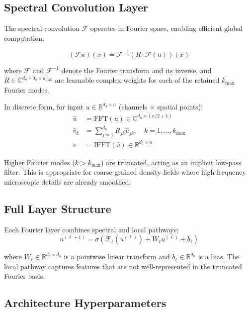 \documentclass[11pt]{article}
\newcommand{\R}{\mathbb{R}}
\begin{document}
\subsection{Spectral Convolution Layer}

The spectral convolution $\mathcal{F}$ operates in Fourier space, enabling efficient global computation:

\begin{equation}
    (\mathcal{F} u)(x) = \mathcal{F}^{-1}\left( R \cdot \mathcal{F}(u) \right)(x)
\end{equation}

where $\mathcal{F}$ and $\mathcal{F}^{-1}$ denote the Fourier transform and its inverse, and $R \in \mathbb{C}^{d_h \times d_h \times k_{\max}}$ are learnable complex weights for each of the retained $k_{\max}$ Fourier modes.

In discrete form, for input $u \in \R^{d_h \times n}$ (channels $\times$ spatial points):
\begin{align}
    \hat{u} &= \text{FFT}(u) \in \mathbb{C}^{d_h \times (n/2 + 1)} \\
    \hat{v}_k &= \sum_{j=1}^{d_h} R_{jk} \hat{u}_{jk}, \quad k = 1, \ldots, k_{\max} \\
    v &= \text{IFFT}(\hat{v}) \in \R^{d_h \times n}
\end{align}

Higher Fourier modes ($k > k_{\max}$) are truncated, acting as an implicit low-pass filter. This is appropriate for coarse-grained density fields where high-frequency microscopic details are already smoothed.

\subsection{Full Layer Structure}

Each Fourier layer combines spectral and local pathways:
\begin{equation}
    u^{(\ell+1)} = \sigma\left( \mathcal{F}_\ell(u^{(\ell)}) + W_\ell u^{(\ell)} + b_\ell \right)
\end{equation}

where $W_\ell \in \R^{d_h \times d_h}$ is a pointwise linear transform and $b_\ell \in \R^{d_h}$ is a bias. The local pathway captures features that are not well-represented in the truncated Fourier basis.

\subsection{Architecture Hyperparameters}
\end{document}
